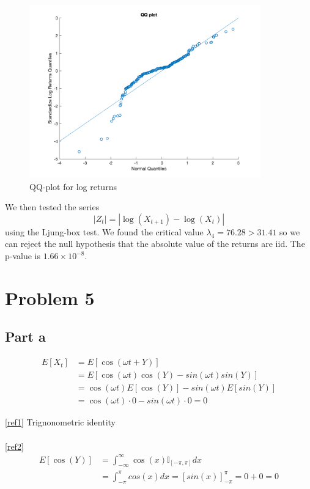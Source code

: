 \documentclass{article}
\begin{document}
\begin{figure}[H]
\includegraphics[width=10cm]{plots/qqplot.png}
\centering
\caption{QQ-plot for log returns}
\label{fig:qqplot}
\end{figure}

We then tested the series
$$
|Z_t| = |\log(X_{t + 1}) - \log(X_t)|
$$
using the Ljung-box test.
We found the critical value $\lambda_4 = 76.28 > 31.41$ so we can reject the null hypothesis that the absolute value of the returns are iid.
The p-value is $1.66 \times 10^{-8}$.

\section*{Problem 5}
\subsection*{Part a}
\begin{align}
    E[X_t] &= E[\cos(\omega t + Y)] \nonumber\\
    &= E[\cos(\omega t) \cos(Y) - sin(\omega t) sin(Y)]  \label{ref1}\\
    &= \cos(\omega t) E[\cos(Y)] - sin(\omega t) E[sin(Y)] \nonumber\\
    &= \cos(\omega t) \cdot 0 - sin(\omega t) \cdot 0 = 0  \label{ref2}
\end{align}

\noindent \eqref{ref1} Trignonometric identity \\
\\
\eqref{ref2} 
\begin{align*}
E[\cos(Y)] &= \int_{-\infty}^{\infty} \cos(x) \mathbb{I}_{[-\pi, \pi]} dx \\
&= \int_{-\pi}^{\pi} cos(x) dx = [sin(x)]^{\pi}_{-\pi} = 0 + 0 = 0
\end{align*}
\end{document}
